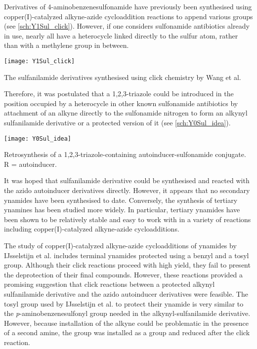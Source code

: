 Derivatives of 4-aminobenzenesulfonamide  have previously been synthesised using copper(I)-catalyzed alkyne-azide cycloaddition reactions to append various groups\cite{Wang2010} (see \ref{sch:Y1Sul_click}). However, if one considers sulfonamide antibiotics already in use, nearly all have a heterocycle linked directly to the sulfur atom, rather than with a methylene group in between. 

\begin{scheme}[H]
	\begin{center}
		\texttt{[image: Y1Sul\_click]}
		\caption{The sulfanilamide derivatives synthesised using click chemistry by Wang et al\cite{Wang2010}.
		\label{sch:Y1Sul_click}}
	\end{center}
\end{scheme}


Therefore, it was postulated that a 1,2,3-triazole could be introduced in the position occupied by a heterocycle in other known sulfonamide antibiotics by attachment of an alkyne directly to the sulfonamide nitrogen to form an alkynyl sulfanilamide derivative  or a protected version of it (see \ref{sch:Y0Sul_idea}).

\begin{scheme}[H]
	\begin{center}
		\texttt{[image: Y0Sul\_idea]}
		\caption{Retrosynthesis of a 1,2,3-triazole-containing autoinducer-sulfonamide conjugate. R = autoinducer.
		\label{sch:Y0Sul_idea}}
	\end{center}
\end{scheme}

It was hoped that sulfanilamide derivative  could be synthesised and reacted with the azido autoinducer derivatives directly. However, it appears that no secondary ynamides have been synthesised to date.
Conversely, the synthesis of tertiary ynamines has been studied more widely\cite{Ficini1976}. In particular, tertiary ynamides have been shown to be relatively stable and easy to work with in a variety of reactions including copper(I)-catalyzed alkyne-azide cycloadditions\cite{IJsselstijn2006,Evano2010}. 

The study of copper(I)-catalyzed alkyne-azide cycloadditions of ynamides by IJsselstijn et al.\cite{IJsselstijn2006} includes terminal ynamides protected using a benzyl and a tosyl group. Although their click reactions proceed with high yield, they fail to present the deprotection of their final compounds. However, these reactions provided a promising suggestion that click reactions between a protected alkynyl sulfanilamide derivative and the azido autoinducer derivatives were feasible. The tosyl group used by IJsselstijn et al.\cite{IJsselstijn2006} to protect their ynamide is very similar to the \textit{p}-aminobenzenesulfonyl group needed in the alkynyl-sulfanilamide derivative. 
However, because installation of the alkyne could be problematic in the presence of a second amine, the  group was installed as a  group and reduced after the click reaction. 


